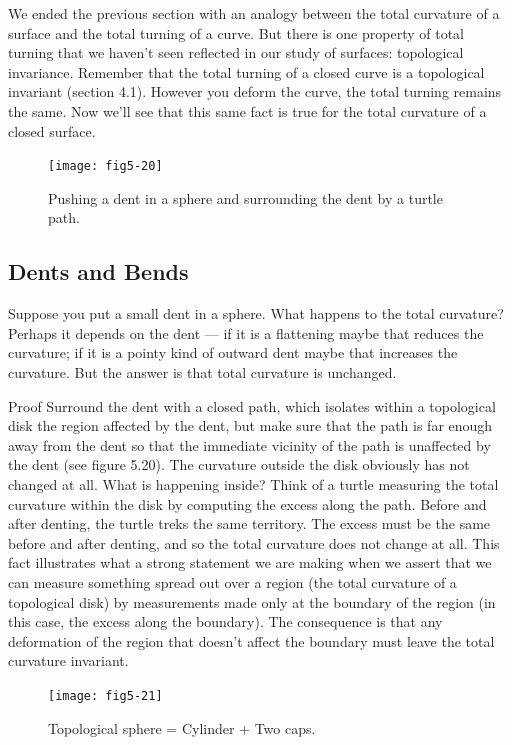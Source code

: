 \documentclass{book}
\begin{document}
We ended the previous section with an analogy between the total curvature of a surface and the total turning of a curve. But there is one
property of total turning that we haven't seen reflected in our study of
surfaces: topological invariance. Remember that the total turning of a
closed curve is a topological invariant (section 4.1). However you deform
the curve, the total turning remains the same. Now we'll see that this
same fact is true for the total curvature of a closed surface.

\begin{figure}
\begin{center}
\texttt{[image: fig5-20]}
\caption{Pushing a dent in a sphere and surrounding the dent by a turtle path.}
\end{center}
\end{figure}

\subsection{Dents and Bends}

Suppose you put a small dent in a sphere. What happens to the total
curvature? Perhaps it depends on the dent --- if it is a flattening maybe
that reduces the curvature; if it is a pointy kind of outward dent maybe
that increases the curvature. But the answer is that total curvature is
unchanged.

Proof Surround the dent with a closed path, which isolates within a
topological disk the region affected by the dent, but make sure that the
path is far enough away from the dent so that the immediate vicinity
of the path is unaffected by the dent (see figure 5.20). The curvature
outside the disk obviously has not changed at all. What is happening
inside? Think of a turtle measuring the total curvature within the disk
by computing the excess along the path. Before and after denting, the
turtle treks the same territory. The excess must be the same before and
after denting, and so the total curvature does not change at all.
This fact illustrates what a strong statement we are making when
we assert that we can measure something spread out over a region (the
total curvature of a topological disk) by measurements made only at the
boundary of the region (in this case, the excess along the boundary). The
consequence is that any deformation of the region that doesn't affect the
boundary must leave the total curvature invariant.

\begin{figure}
\begin{center}
\texttt{[image: fig5-21]}
\caption{Topological sphere = Cylinder + Two caps.}
\end{center}
\end{figure}
\end{document}
